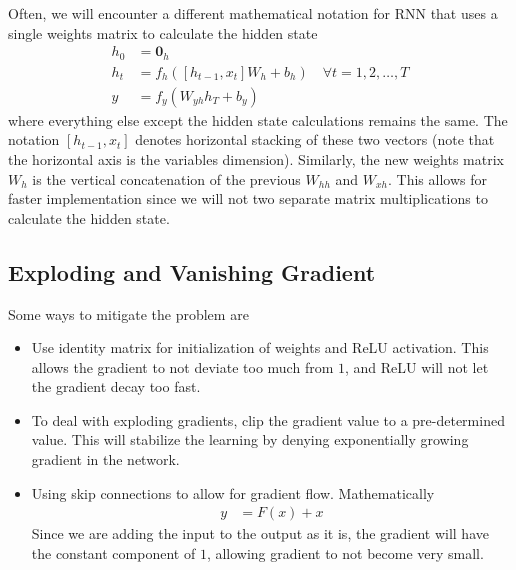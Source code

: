 \documentclass[../../deep_learning_notes.tex]{subfiles}
\begin{document}
Often, we will encounter a different mathematical notation for RNN that uses a single weights matrix to calculate the hidden state
\begin{align*}
    h_{0} &= \bm{0}_{h}\\
    h_{t} &= f_{h}([h_{t-1}, x_{t}]W_{h} + b_{h}) \quad \forall t = 1, 2, \ldots, T\\
    y &= f_{y}(W_{yh}h_{T} + b_{y})
\end{align*}
where everything else except the hidden state calculations remains the same. The notation $[h_{t-1}, x_{t}]$ denotes horizontal stacking of these two vectors (note that the horizontal axis is the variables dimension). Similarly, the new weights matrix $W_{h}$ is the vertical concatenation of the previous $W_{hh}$ and $W_{xh}$. This allows for faster implementation since we will not two separate matrix multiplications to calculate the hidden state.

\subsection{Exploding and Vanishing Gradient}
Some ways to mitigate the problem are
\begin{itemize}
    \item Use identity matrix for initialization of weights and ReLU activation. This allows the gradient to not deviate too much from $1$, and ReLU will not let the gradient decay too fast.
    \item To deal with exploding gradients, clip the gradient value to a pre-determined value. This will stabilize the learning by denying exponentially growing gradient in the network.
    \item Using skip connections to allow for gradient flow. Mathematically
    \begin{align*}
        y &= F(x) + x
    \end{align*}
    Since we are adding the input to the output as it is, the gradient will have the constant component of $1$, allowing gradient to not become very small.
\end{itemize}
\end{document}
